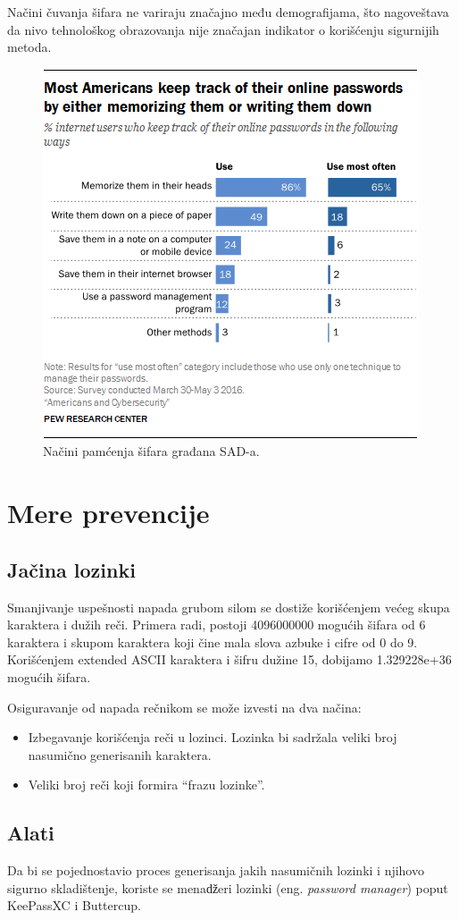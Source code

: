 \documentclass[fleqn, 12pt]{article}
\begin{document}
Načini čuvanja šifara ne variraju značajno među demografijama, što nagoveštava  da nivo tehnološkog obrazovanja nije značajan indikator o korišćenju sigurnijih metoda. \cite{pew1}  
\begin{figure}[H]
    \centering
    \includegraphics[width=0.5\linewidth]{pew.png}
    \caption{Načini pamćenja šifara građana SAD-a.\cite{pew1}}
    \label{fig:enter-label}
\end{figure}

\section{Mere prevencije}
\subsection{Jačina lozinki}
\indent Smanjivanje uspešnosti napada grubom silom se dostiže korišćenjem većeg skupa karaktera i dužih reči. Primera radi, postoji 4096000000 mogućih šifara od 6 karaktera i skupom karaktera koji čine mala slova azbuke i cifre od 0 do 9. Korišćenjem extended ASCII karaktera i šifru dužine 15, dobijamo 1.329228e+36 mogućih šifara. 

Osiguravanje od napada rečnikom se može izvesti na dva načina:
\begin{itemize}
    \item Izbegavanje korišćenja reči u lozinci. Lozinka bi sadržala veliki broj nasumično generisanih karaktera.
    \item Veliki broj reči koji formira ``frazu lozinke''.
\end{itemize}

\subsection{Alati}
\indent Da bi se pojednostavio proces generisanja jakih nasumičnih lozinki i njihovo sigurno skladištenje, koriste se menaǆeri lozinki (eng. \emph{password manager}) poput KeePassXC i Buttercup. 
\end{document}

